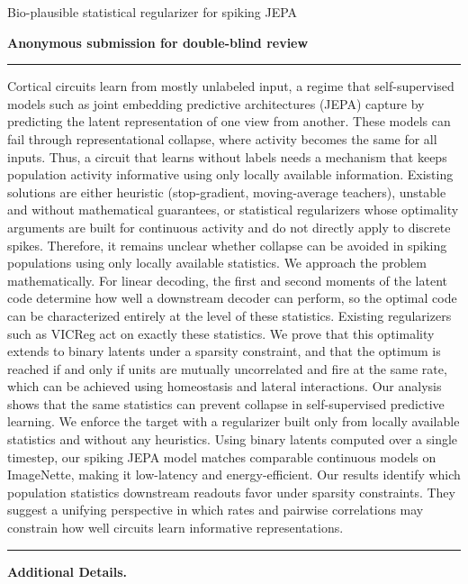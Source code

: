 \documentclass[12pt]{article}
\begin{document}
\begin{NoHyper}
    {\LARGE
        Bio-plausible statistical regularizer for spiking JEPA
    }
    \vspace{3pt}

    {\bf Anonymous submission for double-blind review}

    \vspace{3pt}
    \hrule
    \vspace{3pt}
    Cortical circuits learn from mostly unlabeled input, a regime that self-supervised models such as joint embedding predictive architectures (JEPA) capture by predicting the latent representation of one view from another. These models can fail through representational collapse, where activity becomes the same for all inputs. Thus, a circuit that learns without labels needs a mechanism that keeps population activity informative using only locally available information. Existing solutions are either heuristic (stop-gradient, moving-average teachers), unstable and without mathematical guarantees, or statistical regularizers whose optimality arguments are built for continuous activity and do not directly apply to discrete spikes. Therefore, it remains unclear whether collapse can be avoided in spiking populations using only locally available statistics.
    We approach the problem mathematically. For linear decoding, the first and second moments of the latent code determine how well a downstream decoder can perform, so the optimal code can be characterized entirely at the level of these statistics. Existing regularizers such as VICReg act on exactly these statistics. We prove that this optimality extends to binary latents under a sparsity constraint, and that the optimum is reached if and only if units are mutually uncorrelated and fire at the same rate, which can be achieved using homeostasis and lateral interactions. Our analysis shows that the same statistics can prevent collapse in self-supervised predictive learning. We enforce the target with a regularizer built only from locally available statistics and without any heuristics. Using binary latents computed over a single timestep, our spiking JEPA model matches comparable continuous models on ImageNette, making it low-latency and energy-efficient.
    Our results identify which population statistics downstream readouts favor under sparsity constraints. They suggest a unifying perspective in which rates and pairwise correlations may constrain how well circuits learn informative representations.
    \hrule
    \vspace{10pt}
    \textbf{Additional Details.}


\end{NoHyper}
\end{document}
